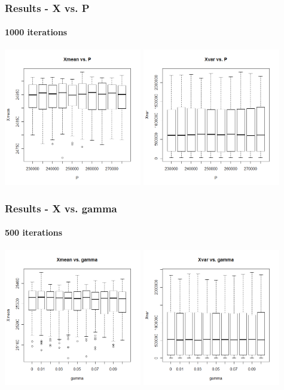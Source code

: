\begin{frame}
    \frametitle{Results - X vs. P }
	\framesubtitle{1000 iterations}
\hspace*{-5mm}
\includegraphics[height=6cm]{boxplot1000_xmean_P}
\includegraphics[height=6cm]{boxplot1000_xvar_P}
\end{frame}





\begin{frame}
    \frametitle{Results - X vs. gamma }
	\framesubtitle{500 iterations}
\hspace*{-5mm}
\includegraphics[height=6cm]{boxplot500_xmean_gamma}
\includegraphics[height=6cm]{boxplot500_xvar_gamma}
\end{frame}

